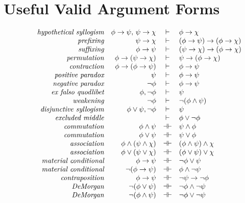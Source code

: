 \chapter{Useful Valid Argument Forms}

\label{equivs}

\[ \begin{array}{>{\raggedleft\it}p{4cm}rcl}
 hypothetical syllogism & \phi \to \psi,\, \psi \to \chi & \vdash & \phi \to \chi \\
prefixing & \psi \to \chi & \vdash & (\phi\to\psi )\to (\phi \to \chi ) \\
suffixing & \phi\to\psi & \vdash & (\psi\to\chi )\to (\phi\to\chi )\\
permutation & \phi\to (\psi \to \chi ) & \vdash & \psi \to (\phi\to \chi ) \\
contraction & \phi\to (\phi\to\psi ) & \vdash & \phi\to \psi \\
positive paradox & \psi & \vdash & \phi\to \psi \\
negative paradox & \neg \phi & \vdash & \phi\to\psi  \\
ex falso quodlibet & \phi ,\neg \phi & \vdash & \psi \\
     weakening & \neg \phi & \vdash & \neg (\phi\wedge\psi ) \\
     disjunctive syllogism & \phi\vee\psi ,\neg \phi & \vdash & \psi \\
     excluded middle & & \vdash & \phi \vee\neg \phi \\
     commutation & \phi\wedge \psi & \dashv\vdash & \psi\wedge \phi \\
     commutation & \phi\vee\psi & \dashv\vdash & \psi\vee\phi \\ 
association & \phi\wedge (\psi\wedge\chi ) & \dashv\vdash & (\phi\wedge \psi)\wedge \chi \\
association & \phi\vee (\psi\vee \chi) & \dashv\vdash & (\phi \vee \psi )\vee \chi \\
material conditional & \phi\to\psi & \dashv\vdash & \neg \phi\vee \psi \\ 
material conditional & \neg (\phi\to \psi ) & \dashv\vdash & \phi\wedge\neg \psi \\
contraposition & \phi\to\psi & \dashv\vdash & \neg \psi\to \neg \phi \\
DeMorgan & \neg (\phi\vee \psi) & \dashv\vdash & \neg \phi\wedge\neg \psi \\
DeMorgan & \neg (\phi\wedge \psi) & \dashv\vdash & \neg \phi\vee \neg \psi  \\

\end{array}\]
